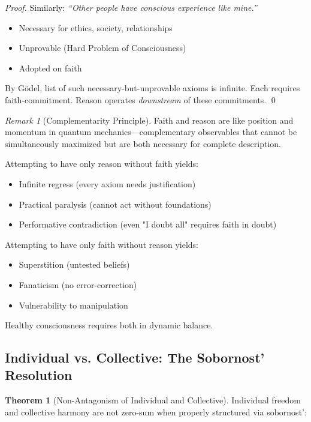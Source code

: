 \documentclass[11pt,a4paper]{article}
\theoremstyle{definition}
\newtheorem{theorem}{Theorem}[section]
\theoremstyle{remark}
\newtheorem{remark}{Remark}[section]
\begin{document}
\begin{enumerate}
\begin{proof}
Similarly: \textit{``Other people have conscious experience like mine.''}
\begin{itemize}
    \item Necessary for ethics, society, relationships
    \item Unprovable (Hard Problem of Consciousness)
    \item Adopted on faith
\end{itemize}

By Gödel, list of such necessary-but-unprovable axioms is infinite. Each requires faith-commitment. Reason operates \textit{downstream} of these commitments. \qed
\end{proof}

\begin{remark}[Complementarity Principle]
Faith and reason are like position and momentum in quantum mechanics—complementary observables that cannot be simultaneously maximized but are both necessary for complete description.

Attempting to have only reason without faith yields:
\begin{itemize}
    \item Infinite regress (every axiom needs justification)
    \item Practical paralysis (cannot act without foundations)
    \item Performative contradiction (even "I doubt all" requires faith in doubt)
\end{itemize}

Attempting to have only faith without reason yields:
\begin{itemize}
    \item Superstition (untested beliefs)
    \item Fanaticism (no error-correction)
    \item Vulnerability to manipulation
\end{itemize}

Healthy consciousness requires both in dynamic balance.
\end{remark}

\subsection{Individual vs. Collective: The Sobornost' Resolution}

\begin{theorem}[Non-Antagonism of Individual and Collective]
Individual freedom and collective harmony are not zero-sum when properly structured via sobornost':


\end{theorem}
\end{enumerate}
\end{document}
